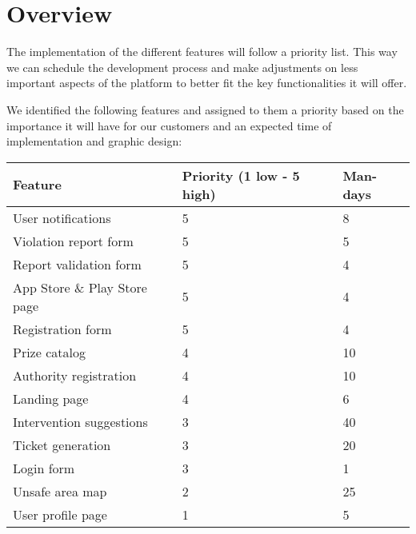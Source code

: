 \section{Overview}

The implementation of the different features will follow a priority list. This way
we can schedule the development process and make adjustments on less important aspects of
the platform to better fit the key functionalities it will offer.

We identified the following features and assigned to them a priority based on the importance
it will have for our customers and an expected time of implementation and graphic design:

\begin{table}[h]
  \centering
  \begin{tabular}{l|l|l}
    \hline
    \textbf{Feature} & \textbf{Priority (1 low - 5 high)} & \textbf{Man-days} \\
    \hline
    User notifications & 5 & 8 \\
    Violation report form & 5 & 5 \\
    Report validation form & 5 & 4 \\
    App Store \& Play Store page & 5 & 4 \\
    Registration form & 5 & 4 \\
    Prize catalog & 4 & 10 \\
    Authority registration & 4 & 10 \\
    Landing page & 4 & 6 \\
    Intervention suggestions & 3 & 40 \\
    Ticket generation & 3 & 20 \\
    Login form & 3 & 1 \\
    Unsafe area map & 2 & 25 \\
    User profile page & 1 & 5 \\
  \end{tabular}
\end{table}